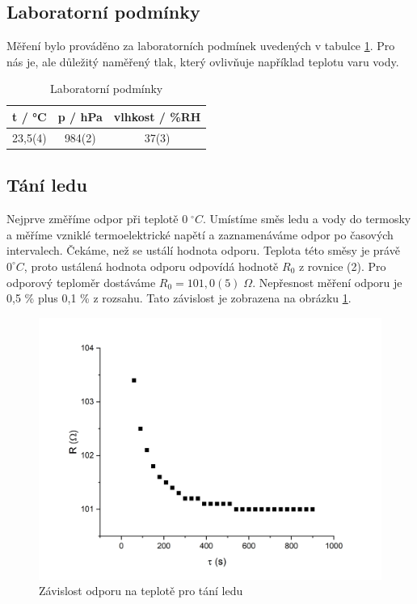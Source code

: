 \subsection{Laboratorní podmínky}

    Měření bylo prováděno za laboratorních podmínek uvedených v tabulce \ref{tab:lab_pod}. Pro nás je, ale důležitý naměřený tlak, který ovlivňuje například teplotu varu vody.

    \begin{table}[h]
        \centering
        \begin{tabular}{|c|c|c|} 
        \hline
            t / °C & p / hPa & vlhkost / \%RH  \\ 
        \hline
            23,5(4)   & 984(2)   & 37(3)            \\
        \hline
        \end{tabular}
        \caption{Laboratorní podmínky}
        \label{tab:lab_pod}
    \end{table}

\subsection{Tání ledu}
Nejprve změříme odpor při teplotě $0 \; ^\circ C$. Umístíme směs ledu a vody do termosky a měříme vzniklé termoelektrické napětí a zaznamenáváme odpor po časových intervalech. Čekáme, než se ustálí hodnota odporu. Teplota této směsy je právě $0 ^\circ C$, proto ustálená hodnota odporu odpovídá hodnotě $R_0$ z rovnice (2). Pro odporový teploměr dostáváme $R_0 = 101,0(5) \; \Omega$. Nepřesnost měření odporu je 0,5 \% plus 0,1 \% z rozsahu. Tato závislost je zobrazena na obrázku \ref{fig:odpor-na-teplote-led}.

\begin{figure}[h]
    \centering
    \includegraphics[width=0.5\linewidth]{8 - Kalibrace odporového teploměru a termočlánku//Prototkol - kalibrace teploměru//img/Závislost R na t, tání ledu.png}
    \caption{Závislost odporu na teplotě pro tání ledu}
    \label{fig:odpor-na-teplote-led}
\end{figure}

